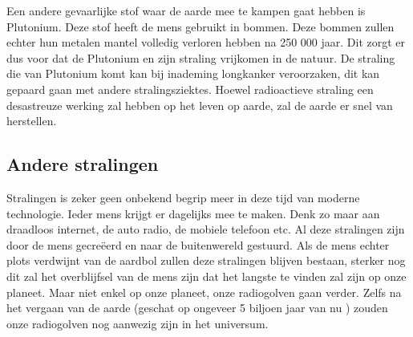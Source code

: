 \newline\newline
Een andere gevaarlijke stof waar de aarde mee te kampen gaat hebben is Plutonium. Deze stof heeft de mens gebruikt in bommen. Deze bommen zullen echter hun metalen mantel volledig verloren hebben na 250 000 jaar. Dit zorgt er dus voor dat de Plutonium en zijn straling vrijkomen in de natuur. De straling die van Plutonium komt kan bij inademing longkanker veroorzaken, dit kan gepaard gaan met andere stralingsziektes.\cite{WorldWithoutUs}
\newline\newline
Hoewel radioactieve straling een desastreuze werking zal hebben op het leven op aarde, zal de aarde er snel van herstellen. 
\subsection{Andere stralingen}
Stralingen is zeker geen onbekend begrip meer in deze tijd van moderne technologie. Ieder mens krijgt er dagelijks mee te maken. Denk zo maar aan draadloos internet, de auto radio, de mobiele telefoon etc. Al deze stralingen zijn door de mens gecre\"{e}erd en naar de buitenwereld gestuurd. 
\newline\newline
Als de mens echter plots verdwijnt van de aardbol zullen deze stralingen blijven bestaan, sterker nog dit zal het overblijfsel van de mens zijn dat het langste te vinden zal zijn op onze planeet. Maar niet enkel op onze planeet, onze radiogolven gaan verder. Zelfs na het vergaan van de aarde (geschat op ongeveer 5 biljoen jaar van nu \cite{WorldWithoutUs}) zouden onze radiogolven nog aanwezig zijn in het universum.
